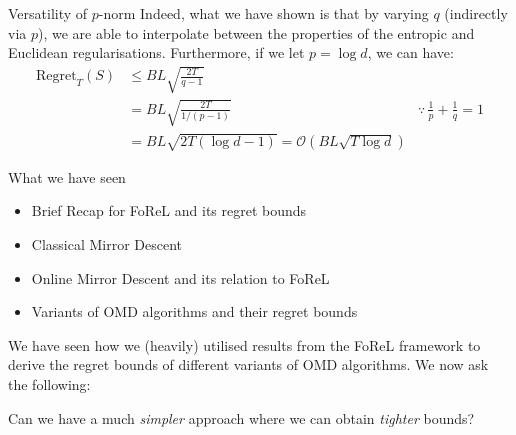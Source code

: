 \begin{frame}{Versatility of $p$-norm}
    Indeed, what we have shown is that by varying $q$ (indirectly via $p$), we are able to interpolate between the properties of the entropic and Euclidean regularisations. Furthermore, if we let $p = \log d$, we can have: \begin{align*}
    \text{Regret}_T(S) &\leq BL \sqrt{\frac{2T}{q-1}}\\
    &= BL \sqrt{\frac{2T}{1/(p-1)}} &\because \,\frac{1}{p} + \frac{1}{q} = 1\\
    &= BL \sqrt{2T(\log d - 1)} = \mathcal{O}(BL\sqrt{T\log d})
\end{align*}
\end{frame}

\begin{frame}{What we have seen}
    \begin{itemize}
        \item Brief Recap for FoReL and its regret bounds
        \item Classical Mirror Descent 
        \item Online Mirror Descent and its relation to FoReL
        \item Variants of OMD algorithms and their regret bounds
    \end{itemize}
    \pause
    We have seen how we (heavily) utilised results from the FoReL framework to derive the regret bounds of different variants of OMD algorithms. We now ask the following:
    \begin{block}{}
        Can we have a much \textit{simpler} approach where we can obtain \textit{tighter} bounds?
    \end{block}
\end{frame}
